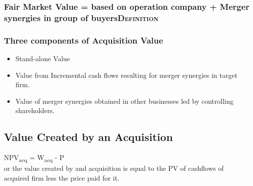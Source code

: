 \documentclass[11pt]{article}
\begin{document}
\subsubsection*{Fair Market Value = based on operation company + Merger synergies in group of buyers\hfill{}\textsc{Definition}}
\label{sec:orgaa5b578}
\subsubsection*{Three components of Acquisition Value}
\label{sec:orgb655d73}
\begin{itemize}
\item Stand-alone Value
\label{sec:org6217d7b}
\item Value from Incremental cash flows resulting for merger synergies in target firm.
\label{sec:org055fbec}
\item Value of merger synergies obtained in other businesses led by controlling shareholders.
\label{sec:org1926537}
\end{itemize}
\subsection*{Value Created by an Acquisition}
\label{sec:org7d89bcb}
NPV\textsubscript{acq} = W\textsubscript{acq} - P\\
or the value created by and acquisition is equal to the PV of cashflows of acquired firm less the price paid for it.\\
\end{document}
